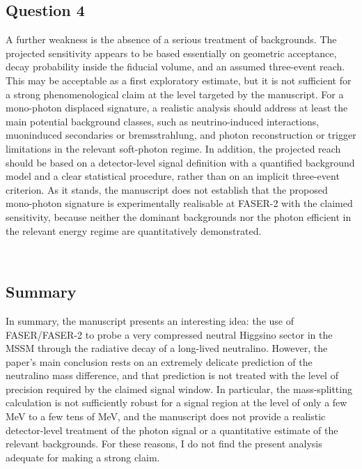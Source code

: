\documentclass{ar2rc}
\begin{document}
\AR 

\subsection*{Question 4}
\RC A further weakness is the absence of a serious treatment of backgrounds. The projected sensitivity appears to be based essentially on geometric acceptance, decay probability inside the fiducial volume, and an assumed three-event reach. This may be acceptable as a first exploratory estimate, but it is not sufficient for a strong phenomenological claim at the level targeted by the manuscript. For a mono-photon displaced signature, a realistic analysis should address at least the main potential background classes, such as neutrino-induced interactions, muoninduced secondaries or bremsstrahlung, and photon reconstruction or trigger limitations in the relevant soft-photon regime. In addition, the projected reach should be based on a detector-level signal definition with a quantified background model and a clear statistical procedure, rather than on an implicit three-event criterion. As it stands, the manuscript does not establish that the proposed mono-photon signature is experimentally realisable at FASER-2 with the claimed sensitivity, because neither the dominant backgrounds nor the photon efficient in the relevant energy regime are quantitatively demonstrated.

\AR \\

\subsection*{Summary}
\RC In summary, the manuscript presents an interesting idea: the use of FASER/FASER-2 to probe a very compressed neutral Higgsino sector in the MSSM through the radiative decay of a long-lived neutralino. However, the paper’s main conclusion rests on an extremely delicate prediction of the neutralino mass difference, and that prediction is not treated with the level of precision required by the claimed signal window. In particular, the mass-splitting calculation is not sufficiently robust for a signal region at the level of only a few MeV to a few tens of MeV, and the manuscript does not provide a realistic detector-level treatment of the photon signal or a quantitative estimate of the relevant backgrounds. For these reasons, I do not find the present analysis adequate for making a strong claim. \\

\AR 



\end{document}

